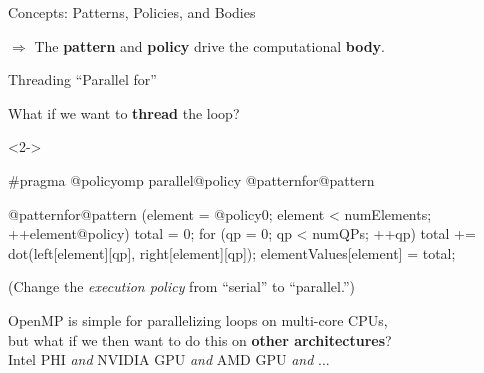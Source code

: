 \begin{frame}[fragile]{Concepts: Patterns, Policies, and Bodies}
  \vspace{2pt}

  \textbf{$\Rightarrow$} The \textbf{pattern} and \textbf{policy} drive the computational \textbf{body}.

  \vspace{-5pt}

\end{frame}


\begin{frame}[fragile]{Threading ``Parallel for''}

  What if we want to \textbf{thread} the loop?

  \vspace{5pt}


  \begin{onlyenv}<2->
  \begin{code}[linebackgroundcolor={
      }
    ]
#pragma @policyomp parallel@policy @patternfor@pattern
  \end{code}
  \end{onlyenv}

  \vspace{-12pt}

  \begin{code}[linebackgroundcolor={
        \btLstHL<1-3>{2-6}{bodyColor}
      }
    ]
@patternfor@pattern (element = @policy0; element < numElements; ++element@policy) {
  total = 0;
  for (qp = 0; qp < numQPs; ++qp) {
    total += dot(left[element][qp], right[element][qp]);
  }
  elementValues[element] = total;
}
  \end{code}

  \vspace{2pt}
  \pause

  \hspace{10pt}(Change the \emph{execution policy} from ``serial'' to ``parallel.'')

  \vspace{10pt}
  \pause

  OpenMP is simple for parallelizing loops on multi-core CPUs, \\
  but what if we then want to do this on \textbf{other architectures}? \\
  \vspace{5pt}
  \hspace{10pt}
  Intel PHI \textit{and} NVIDIA GPU \textit{and} AMD GPU \textit{and} ...

  \vspace{10pt}


\end{frame}

